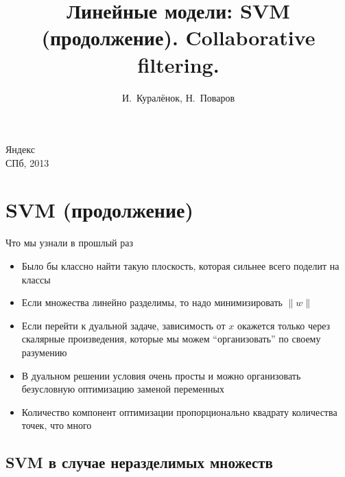 \documentclass[14pt, fleqn, xcolor={dvipsnames, table}]{beamer}
\title{Линейные модели: SVM (продолжение). Collaborative filtering.\\\small{}}
\author[]{\small{%
И.~Куралёнок,
Н.~Поваров}}
\date{}
\begin{document}
\begin{frame}

\maketitle
\small
\begin{center}
\vspace{-60pt}
\normalsize {\color{red}Я}ндекс \\
\vspace{80pt}
\footnotesize СПб, 2013
\end{center}
\end{frame}

\section{SVM (продолжение)}
\begin{frame}{Что мы узнали в прошлый раз}
\small
\begin{itemize}
  \item Было бы классно найти такую плоскость, которая сильнее всего поделит на классы
  \item Если множества линейно разделимы, то надо минимизировать $\|w\|$
  \item Если перейти к дуальной задаче, зависимость от $x$ окажется только через скалярные произведения, которые мы можем ``организовать'' по своему разумению
  \item В дуальном решении условия очень просты и можно организовать безусловную оптимизацию заменой переменных
  \item Количество компонент оптимизации пропорционально квадрату количества точек, что много
\end{itemize}
\end{frame}

\subsection{SVM в случае неразделимых множеств} %
\end{document}
